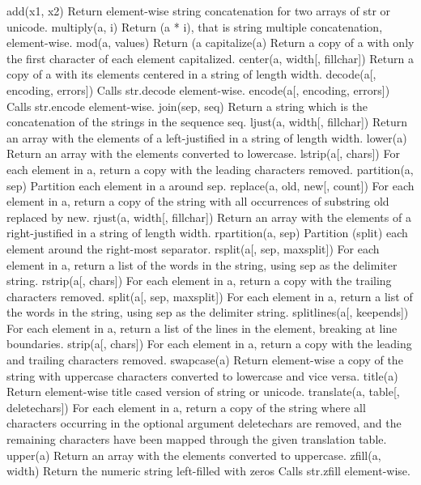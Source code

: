 add(x1, x2)	Return element-wise string concatenation for two arrays of str or unicode.
multiply(a, i)	Return (a * i), that is string multiple concatenation, element-wise.
mod(a, values)	Return (a %
capitalize(a)	Return a copy of a with only the first character of each element capitalized.
center(a, width[, fillchar])	Return a copy of a with its elements centered in a string of length width.
decode(a[, encoding, errors])	Calls str.decode element-wise.
encode(a[, encoding, errors])	Calls str.encode element-wise.
join(sep, seq)	Return a string which is the concatenation of the strings in the sequence seq.
ljust(a, width[, fillchar])	Return an array with the elements of a left-justified in a string of length width.
lower(a)	Return an array with the elements converted to lowercase.
lstrip(a[, chars])	For each element in a, return a copy with the leading characters removed.
partition(a, sep)	Partition each element in a around sep.
replace(a, old, new[, count])	For each element in a, return a copy of the string with all occurrences of substring old replaced by new.
rjust(a, width[, fillchar])	Return an array with the elements of a right-justified in a string of length width.
rpartition(a, sep)	Partition (split) each element around the right-most separator.
rsplit(a[, sep, maxsplit])	For each element in a, return a list of the words in the string, using sep as the delimiter string.
rstrip(a[, chars])	For each element in a, return a copy with the trailing characters removed.
split(a[, sep, maxsplit])	For each element in a, return a list of the words in the string, using sep as the delimiter string.
splitlines(a[, keepends])	For each element in a, return a list of the lines in the element, breaking at line boundaries.
strip(a[, chars])	For each element in a, return a copy with the leading and trailing characters removed.
swapcase(a)	Return element-wise a copy of the string with uppercase characters converted to lowercase and vice versa.
title(a)	Return element-wise title cased version of string or unicode.
translate(a, table[, deletechars])	For each element in a, return a copy of the string where all characters occurring in the optional argument deletechars are removed, and the remaining characters have been mapped through the given translation table.
upper(a)	Return an array with the elements converted to uppercase.
zfill(a, width)	Return the numeric string left-filled with zeros Calls str.zfill element-wise.
